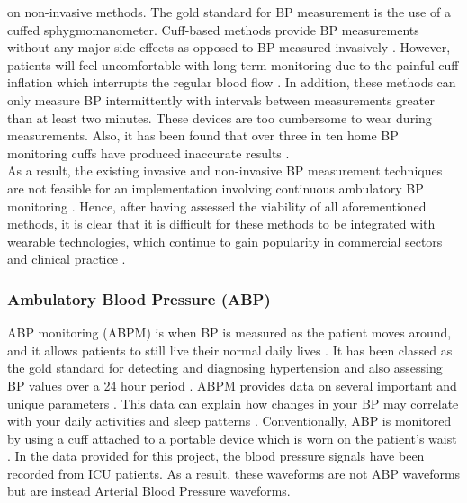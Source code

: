 on non-invasive methods. The gold standard for BP measurement is the use of a 
cuffed sphygmomanometer. Cuff-based methods provide BP measurements without 
any major side effects as opposed to BP measured invasively \cite{ElHajj2020}. However, 
patients will feel uncomfortable with long term monitoring due to the painful cuff 
inflation which interrupts the regular blood flow \cite{Tanveer2018}. In addition, 
these methods can only measure BP intermittently with intervals between measurements 
greater than at least two minutes. These devices are too cumbersome to wear during 
measurements. Also, it has been found that over three in ten home BP monitoring 
cuffs have produced inaccurate results \cite{Leung2016}. \\ \newline \noindent  As a 
result, the existing invasive and non-invasive BP measurement techniques are not 
feasible for an implementation involving continuous ambulatory BP 
monitoring \cite{ElHajj2020}. Hence, after having assessed the viability of all 
aforementioned methods, it is clear that it is difficult for these methods to be 
integrated with wearable technologies, which continue to gain popularity in 
commercial sectors and clinical practice \cite{Sharma2017}.

\subsubsection{Ambulatory Blood Pressure (ABP)}
ABP monitoring (ABPM) is when BP is measured as the patient moves around, and it allows 
patients to still live their normal daily lives \cite{Huang2021}. It has been 
classed as the gold standard for detecting and diagnosing hypertension and 
also assessing BP values over a 24 hour period \cite{Kario2021}. ABPM provides 
data on several important and unique parameters \cite{Kario2021}. This data can
 explain how changes in your BP may correlate with your daily activities and sleep 
 patterns \cite{Huang2021}. Conventionally,  ABP is monitored by using a cuff 
 attached to a portable device which is worn on the patient's 
 waist \cite{Kario2021}. In the data provided for this project, the blood pressure signals 
 have been recorded from ICU patients. As a result, these waveforms are not ABP waveforms but are 
 instead Arterial Blood Pressure waveforms.



